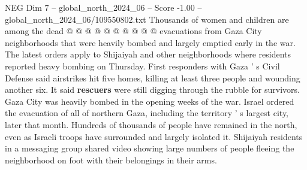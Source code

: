 \begin{textsample}{NEG Dim 7 – global\_north\_2024\_06 – Score -1.00 – global\_north\_2024\_06/109550802.txt}
Thousands of women and children are among the dead @ @ @ @ @ @ @ @ @ @ evacuations from Gaza City neighborhoods that were heavily bombed and largely emptied early in the war.
The latest orders apply to Shijaiyah and other neighborhoods where residents reported heavy bombing on Thursday.
First responders with Gaza ' s Civil Defense said airstrikes hit five homes, killing at least three people and wounding another six.
It said \textbf{rescuers} were still digging through the rubble for survivors.
Gaza City was heavily bombed in the opening weeks of the war.
Israel ordered the evacuation of all of northern Gaza, including the territory ' s largest city, later that month.
Hundreds of thousands of people have remained in the north, even as Israeli troops have surrounded and largely isolated it.
Shijaiyah residents in a messaging group shared video showing large numbers of people fleeing the neighborhood on foot with their belongings in their arms.

\end{textsample}
